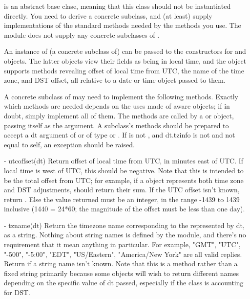  is an abstract base clase, meaning that this class
should not be instantiated directly.  You need to derive a concrete
subclass, and (at least) supply implementations of the standard
 methods needed by the  methods you
use. The  module does not supply any concrete
subclasses of .

An instance of (a concrete subclass of)  can be passed
to the constructors for  and  objects.
The latter objects view their fields as being in local time, and the
 object supports methods revealing offset of local time
from UTC, the name of the time zone, and DST offset, all relative to a
date or time object passed to them.

A concrete subclass of  may need to implement the
following methods.  Exactly which methods are needed depends on the
uses made of aware  objects; if in doubt, simply
implement all of them.  The methods are called by a 
or  object, passing itself as the argument.  A
 subclass's methods should be prepared to accept a dt
argument of  or of type  or
.  If is not , and dt.tzinfo is not
 and not equal to self, an exception should be raised.

  - utcoffset(dt)
    Return offset of local time from UTC, in minutes east of UTC.  If
    local time is west of UTC, this should be negative.  Note that this
    is intended to be the total offset from UTC; for example, if a
     object represents both time zone and DST adjustments,
     should return their sum.  If the UTC offset
    isn't known, return .  Else the value returned must be
    an integer, in the range -1439 to 1439 inclusive (1440 = 24*60;
    the magnitude of the offset must be less than one day).

  - tzname(dt)
    Return the timezone name corresponding to the  represented
    by dt, as a string.  Nothing about string names is defined by the
     module, and there's no requirement that it mean anything
    in particular.  For example, "GMT", "UTC", "-500", "-5:00", "EDT",
    "US/Eastern", "America/New York" are all valid replies.  Return
     if a string name isn't known.  Note that this is a method
    rather than a fixed string primarily because some  objects
    will wish to return different names depending on the specific value
    of dt passed, especially if the  class is accounting for DST.

